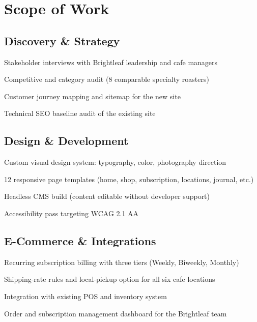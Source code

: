 \section{Scope of Work}

\subsection{Discovery \& Strategy}
\begin{checklist}
  \item Stakeholder interviews with Brightleaf leadership and cafe managers
  \item Competitive and category audit (8 comparable specialty roasters)
  \item Customer journey mapping and sitemap for the new site
  \item Technical SEO baseline audit of the existing site
\end{checklist}

\subsection{Design \& Development}
\begin{checklist}
  \item Custom visual design system: typography, color, photography direction
  \item 12 responsive page templates (home, shop, subscription, locations, journal, etc.)
  \item Headless CMS build (content editable without developer support)
  \item Accessibility pass targeting WCAG 2.1 AA
\end{checklist}

\subsection{E-Commerce \& Integrations}
\begin{checklist}
  \item Recurring subscription billing with three tiers (Weekly, Biweekly, Monthly)
  \item Shipping-rate rules and local-pickup option for all six cafe locations
  \item Integration with existing POS and inventory system
  \item Order and subscription management dashboard for the Brightleaf team
\end{checklist}

